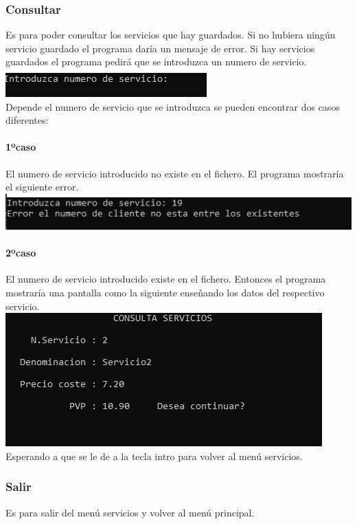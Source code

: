 \documentclass[12pt]{article}
\begin{document}
    \subsubsection{Consultar}
    Es para poder consultar los servicios que hay guardados. Si no hubiera ningún servicio guardado el programa daría un mensaje de error. Si hay servicios guardados el programa pedirá que se introduzca un numero de servicio.\\
    \includegraphics[]{PedirNumeroDeServicio.PNG}\\
     Depende el numero de servicio que se introduzca se pueden encontrar dos casos diferentes:
     \paragraph{1ºcaso}
     El numero de servicio introducido no existe en el fichero. El programa mostraría el siguiente error.\\
    \includegraphics[]{ErrorNumeroDeServicioNoExiste.PNG}
    \paragraph{2ºcaso}
    El numero de servicio introducido existe en el fichero. Entonces el programa mostraría una pantalla como la siguiente enseñando los datos del respectivo servicio.\\
    \includegraphics[]{PantallaConsultaServicioMostrandoServicio.PNG}\\
    Esperando a que se le de a la tecla intro para volver al menú servicios.
\subsubsection{Salir}
    Es para salir del menú servicios y volver al menú principal.
        
\end{document}
